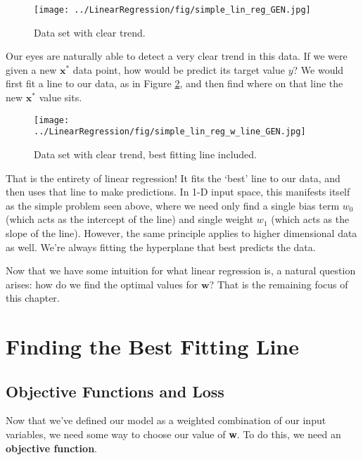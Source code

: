\begin{figure}
    \centering
    \texttt{[image: ../LinearRegression/fig/simple\_lin\_reg\_GEN.jpg]}
    \caption{Data set with clear trend.}
    \label{fig:simple-lin-reg}
\end{figure}

Our eyes are naturally able to detect a very clear trend in this data. If we were given a new $\textbf{x}^{*}$ data point, how would be predict its target value $y$? We would first fit a line to our data, as in Figure \ref{fig:simple-lin-reg-w-line}, and then find where on that line the new $\textbf{x}^{*}$ value sits.

\begin{figure}
    \centering
    \texttt{[image: ../LinearRegression/fig/simple\_lin\_reg\_w\_line\_GEN.jpg]}
    \caption{Data set with clear trend, best fitting line included.}
    \label{fig:simple-lin-reg-w-line}
\end{figure}

That is the entirety of linear regression! It fits the `best' line to our data, and then uses that line to make predictions. In 1-D input space, this manifests itself as the simple problem seen above, where we need only find a single bias term $w_{0}$ (which acts as the intercept of the line) and single weight $w_{1}$ (which acts as the slope of the line). However, the same principle applies to higher dimensional data as well. We're always fitting the hyperplane that best predicts the data.


Now that we have some intuition for what linear regression is, a natural question arises: how do we find the optimal values for $\textbf{w}$? That is the remaining focus of this chapter.

\section{Finding the Best Fitting Line}

\subsection{Objective Functions and Loss}
Now that we've defined our model as a weighted combination of our input variables, we need some way to choose our value of \textbf{w}. To do this, we need an \textbf{objective function}.

